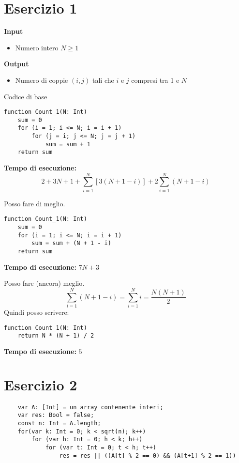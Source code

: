 \documentclass{article}
\begin{document}
\section{Esercizio 1}
\large\textbf{Input}
\begin{itemize}
    \item Numero intero \(N \geq 1\)
\end{itemize}

\noindent\large\textbf{Output}
\begin{itemize}
    \item Numero di coppie \((i,j)\) tali che \(i\) e \(j\) compresi tra 1 e \(N\)
\end{itemize}

\noindent Codice di base
\begin{center}
    \begin{verbatim}
function Count_1(N: Int)
    sum = 0
    for (i = 1; i <= N; i = i + 1)
        for (j = i; j <= N; j = j + 1)
            sum = sum + 1
    return sum
\end{verbatim}
\end{center}
\textbf{Tempo di esecuzione: }
\[2 + 3N + 1 + \sum_{i = 1}^N \left[3\left(N + 1 - i\right)\right] + 2 \sum_{i = 1}^N \left(N + 1 - i\right)\]

\vspace{1.5cm}

\noindent Posso fare di meglio.
\begin{center}
    \begin{verbatim}
function Count_1(N: Int)
    sum = 0
    for (i = 1; i <= N; i = i + 1)
        sum = sum + (N + 1 - i)
    return sum
\end{verbatim}
\end{center}
\textbf{Tempo di esecuzione: } \(7N + 3\)

\vspace{1.5cm}

\noindent Posso fare (ancora) meglio.
\[\sum_{i=1}^N (N + 1 - i) = \sum_{i = 1}^N i = \frac{N(N + 1)}{2}\]
Quindi posso scrivere:
\begin{center}
    \begin{verbatim}
function Count_1(N: Int)
    return N * (N + 1) / 2
\end{verbatim}
\end{center}
\textbf{Tempo di esecuzione: } \(5\)

\pagebreak

\section{Esercizio 2}
\begin{verbatim}
    var A: [Int] = un array contenente interi;
    var res: Bool = false;
    const n: Int = A.length;
    for(var k: Int = 0; k < sqrt(n); k++)
        for (var h: Int = 0; h < k; h++)
            for (var t: Int = 0; t < h; t++)
                res = res || ((A[t] % 2 == 0) && (A[t+1] % 2 == 1))
\end{verbatim}
\end{document}
